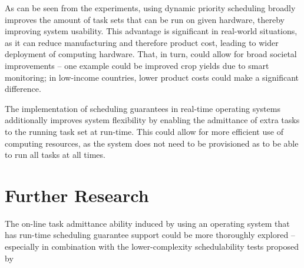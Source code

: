 \documentclass[twoside]{uva-inf-bachelor-thesis}
\begin{document}
As can be seen from the experiments, using dynamic priority scheduling broadly improves the amount of task sets that can be run on given hardware, thereby improving system usability. This advantage is significant in real-world situations, as it can reduce manufacturing and therefore product cost, leading to wider deployment of computing hardware. That, in turn, could allow for broad societal improvements -- one example could be improved crop yields due to smart monitoring; in low-income countries, lower product costs could make a significant difference.

The implementation of scheduling guarantees in real-time operating systems additionally improves system flexibility by enabling the admittance of extra tasks to the running task set at run-time. This could allow for more efficient use of computing resources, as the system does not need to be provisioned as to be able to run all tasks at all times.

\section{Further Research}
The on-line task admittance ability induced by using an operating system that has run-time scheduling guarantee support could be more thoroughly explored -- especially in combination with the lower-complexity schedulability tests proposed by \textcite{Albers}

{
    \hfuzz=8pt
    \printbibliography
}
\end{document}
